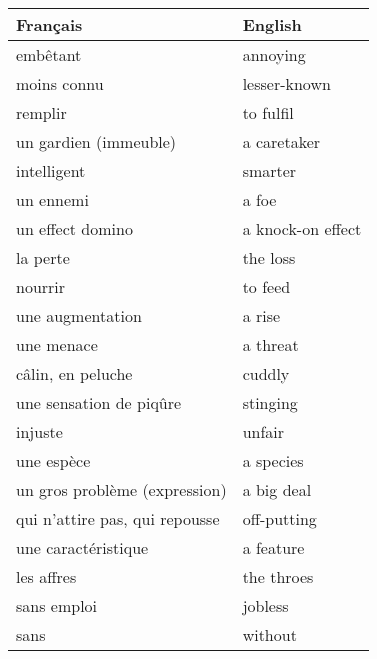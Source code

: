 \documentclass[
  10pt,
]{article}
\begin{document}
\begin{longtable}{ll}
\toprule
Français &  English\\
\midrule
\rowcolor{gray!6}  embêtant & annoying\\

moins connu & lesser-known\\

\rowcolor{gray!6}  remplir & to fulfil\\

un gardien (immeuble) & a caretaker\\

\rowcolor{gray!6}  intelligent & smarter\\

un ennemi & a foe\\

\rowcolor{gray!6}  un effect domino & a knock-on effect\\

la perte & the loss\\

\rowcolor{gray!6}  nourrir & to feed\\

une augmentation & a rise\\

\rowcolor{gray!6}  une menace & a threat\\

câlin, en peluche & cuddly\\

\rowcolor{gray!6}  une sensation de piqûre & stinging\\

injuste & unfair\\

\rowcolor{gray!6}  une espèce & a species\\

un gros problème (expression) & a big deal\\

\rowcolor{gray!6}  qui n'attire pas, qui repousse & off-putting\\

une caractéristique & a feature\\

\rowcolor{gray!6}  les affres & the throes\\

sans emploi & jobless\\

\rowcolor{gray!6}  sans & without\\


\end{longtable}
\end{document}
